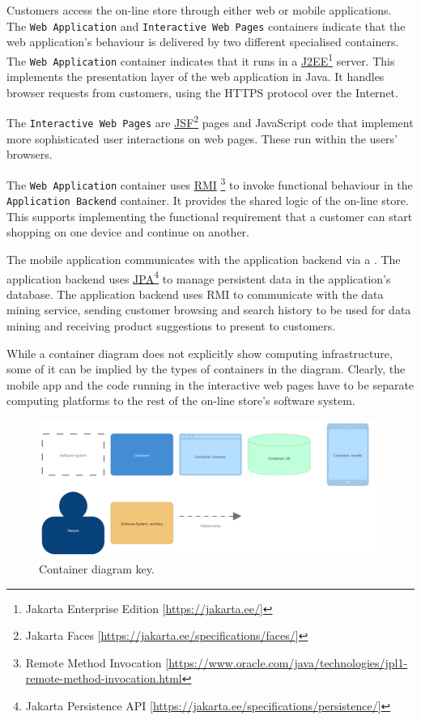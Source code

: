 Customers access the on-line store through either web or mobile applications.
The \texttt{Web Application} and \texttt{Interactive Web Pages} containers indicate
that the web application's behaviour is delivered by two different specialised containers.
The \texttt{Web Application} container indicates that it runs in a 
\href{https://jakarta.ee/}{J2EE}\footnote{Jakarta Enterprise Edition [\url{https://jakarta.ee/}]} server.
This implements the presentation layer of the web application in Java.
It handles browser requests from customers, using the HTTPS protocol over the Internet.

The \texttt{Interactive Web Pages} are
\href{https://jakarta.ee/specifications/faces/}{JSF}\footnote{Jakarta Faces [\url{https://jakarta.ee/specifications/faces/}]}
pages and JavaScript code that implement more sophisticated user interactions on web pages.
These run within the users' browsers.

The \texttt{Web Application} container uses
\href{https://www.oracle.com/java/technologies/jpl1-remote-method-invocation.html}{RMI}%
\footnote{Remote Method Invocation [\url{https://www.oracle.com/java/technologies/jpl1-remote-method-invocation.html}} 
to invoke functional behaviour in the \texttt{Application Backend} container.
It provides the shared logic of the on-line store.
This supports implementing the functional requirement that a customer can start shopping on one device and continue on another.

The mobile application communicates with the application backend via a
.
The application backend uses \href{https://jakarta.ee/specifications/persistence/}
{JPA}\footnote{Jakarta Persistence API [\url{https://jakarta.ee/specifications/persistence/}]}
to manage persistent data in the application's database.
The application backend uses RMI to communicate with the data mining service,
sending customer browsing and search history to be used for data mining
and receiving product suggestions to present to customers.

While a container diagram does not explicitly show computing infrastructure,
some of it can be implied by the types of containers in the diagram.
Clearly, the mobile app and the code running in the interactive web pages
have to be separate computing platforms to the rest of the on-line store's software system.

\begin{figure}[h!]
    \centering
    \includegraphics[trim=22 21 98 26,clip,width=\textwidth]{images/c4/container_diagram-key.png}
    \caption{Container diagram key.}
    \label{fig:c4_container_key}
\end{figure}

